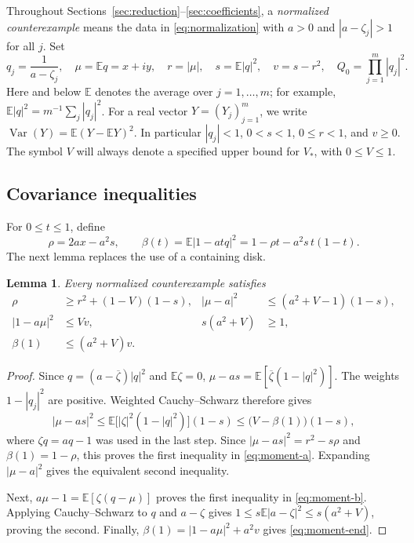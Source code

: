 \documentclass[11pt,reqno]{amsart}
\newtheorem{lem}[thm]{Lemma}
\theoremstyle{definition}
\theoremstyle{remark}
\numberwithin{equation}{section}
\newcommand{\E}{\mathbb E}
\newcommand{\Var}{\operatorname{Var}}
\begin{document}
Throughout Sections~\ref{sec:reduction}--\ref{sec:coefficients}, a \emph{normalized counterexample} means the data in \eqref{eq:normalization} with $a>0$ and $|a-\zeta_j|>1$ for all $j$. Set
\begin{equation}\label{eq:reciprocal}
 q_j=\frac1{a-\zeta_j},\quad
 \mu=\E q=x+iy,\quad r=|\mu|,\quad
 s=\E|q|^2,\quad v=s-r^2,\quad Q_0=\prod_{j=1}^m|q_j|^2.
\end{equation}
Here and below $\E$ denotes the average over $j=1,\ldots,m$; for example, $\E|q|^2=m^{-1}\sum_j|q_j|^2$. For a real vector $Y=(Y_j)_{j=1}^m$, we write $\Var(Y)=\E(Y-\E Y)^2$. In particular $|q_j|<1$, $0<s<1$, $0\le r<1$, and $v\ge0$. The symbol $V$ will always denote a specified upper bound for $V_*$, with $0\le V\le1$.

\subsection{Covariance inequalities}

For $0\le t\le1$, define
\begin{equation}\label{eq:beta}
 \rho=2ax-a^2s,\qquad
 \beta(t)=\E|1-atq|^2
 =1-\rho t-a^2s\,t(1-t).
\end{equation}
The next lemma replaces the use of a containing disk.

\begin{lem}\label{lem:moments}
Every normalized counterexample satisfies
\begin{align}
 \rho&\ge r^2+(1-V)(1-s),&
 |\mu-a|^2&\le(a^2+V-1)(1-s),\label{eq:moment-a}\\
 |1-a\mu|^2&\le Vv,&
 s(a^2+V)&\ge1,\label{eq:moment-b}\\
 \beta(1)&\le(a^2+V)v.&&\label{eq:moment-end}
\end{align}
\end{lem}
\begin{proof}
Since $q=(a-\overline\zeta)|q|^2$ and $\E\zeta=0$,
$\mu-as=\E[\overline\zeta(1-|q|^2)]$.
The weights $1-|q_j|^2$ are positive. Weighted Cauchy--Schwarz therefore gives
\[
 |\mu-as|^2
 \le\E\bigl[|\zeta|^2(1-|q|^2)\bigr](1-s)
 \le\bigl(V-\beta(1)\bigr)(1-s),
\]
where $\zeta q=aq-1$ was used in the last step. Since $|\mu-as|^2=r^2-s\rho$ and $\beta(1)=1-\rho$, this proves the first inequality in \eqref{eq:moment-a}. Expanding $|\mu-a|^2$ gives the equivalent second inequality.

Next, $a\mu-1=\E[\zeta(q-\mu)]$ proves the first inequality in \eqref{eq:moment-b}. Applying Cauchy--Schwarz to $q$ and $a-\zeta$ gives $1\le s\E|a-\zeta|^2\le s(a^2+V)$, proving the second. Finally, $\beta(1)=|1-a\mu|^2+a^2v$ gives \eqref{eq:moment-end}.
\end{proof}
\end{document}
